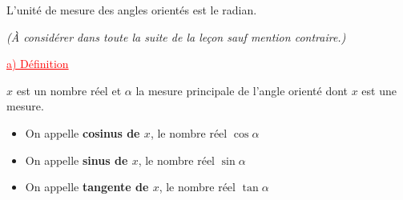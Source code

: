 \documentclass[a4paper,12pt]{article}
\begin{document}
L’unité de mesure des angles orientés est le radian.

\begin{flushleft}
\textit{(À considérer dans toute la suite de la leçon sauf mention contraire.)}
\end{flushleft}

\vspace{1em}
\textcolor{red}{\underline{a) Définition}}

\vspace{0.5em}

\( x \) est un nombre réel et \( \alpha \) la mesure principale de l’angle orienté dont \( x \) est une mesure.

\begin{itemize}[label=\textbullet]
    \item On appelle \textbf{cosinus de \( x \)}, le nombre réel \( \cos \alpha \)
    \item On appelle \textbf{sinus de \( x \)}, le nombre réel \( \sin \alpha \)
    \item On appelle \textbf{tangente de \( x \)}, le nombre réel \( \tan \alpha \)
\end{itemize}
\end{document}
